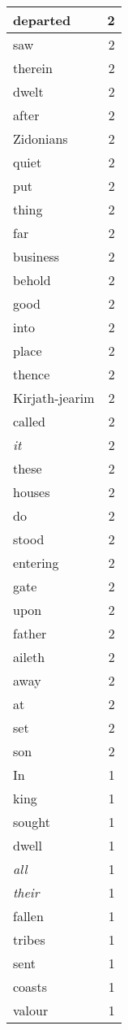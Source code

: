 \begin{center}
\begin{longtable}{l|r}
departed & 2\\ \hline 
saw & 2\\ \hline 
therein & 2\\ \hline 
dwelt & 2\\ \hline 
after & 2\\ \hline 
Zidonians & 2\\ \hline 
quiet & 2\\ \hline 
put & 2\\ \hline 
thing & 2\\ \hline 
far & 2\\ \hline 
business & 2\\ \hline 
behold & 2\\ \hline 
good & 2\\ \hline 
into & 2\\ \hline 
place & 2\\ \hline 
thence & 2\\ \hline 
Kirjath-jearim & 2\\ \hline 
called & 2\\ \hline 
\emph{it} & 2\\ \hline 
these & 2\\ \hline 
houses & 2\\ \hline 
do & 2\\ \hline 
stood & 2\\ \hline 
entering & 2\\ \hline 
gate & 2\\ \hline 
upon & 2\\ \hline 
father & 2\\ \hline 
aileth & 2\\ \hline 
away & 2\\ \hline 
at & 2\\ \hline 
set & 2\\ \hline 
son & 2\\ \hline 
In & 1\\ \hline 
king & 1\\ \hline 
sought & 1\\ \hline 
dwell & 1\\ \hline 
\emph{all} & 1\\ \hline 
\emph{their} & 1\\ \hline 
fallen & 1\\ \hline 
tribes & 1\\ \hline 
sent & 1\\ \hline 
coasts & 1\\ \hline 
valour & 1\\ \hline 

\end{longtable}
\end{center}
